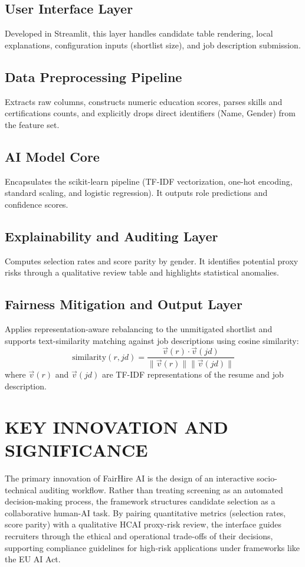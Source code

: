 \documentclass[sigconf]{acmart}
\begin{document}
\subsection{User Interface Layer}
Developed in Streamlit, this layer handles candidate table rendering, local explanations, configuration inputs (shortlist size), and job description submission.

\subsection{Data Preprocessing Pipeline}
Extracts raw columns, constructs numeric education scores, parses skills and certifications counts, and explicitly drops direct identifiers (Name, Gender) from the feature set.

\subsection{AI Model Core}
Encapsulates the scikit-learn pipeline (TF-IDF vectorization, one-hot encoding, standard scaling, and logistic regression). It outputs role predictions and confidence scores.

\subsection{Explainability and Auditing Layer}
Computes selection rates and score parity by gender. It identifies potential proxy risks through a qualitative review table and highlights statistical anomalies.

\subsection{Fairness Mitigation and Output Layer}
Applies representation-aware rebalancing to the unmitigated shortlist and supports text-similarity matching against job descriptions using cosine similarity:
\begin{equation}
\text{similarity}(r, jd) = \frac{\vec{v}(r) \cdot \vec{v}(jd)}{\|\vec{v}(r)\| \|\vec{v}(jd)\|}
\end{equation}
where $\vec{v}(r)$ and $\vec{v}(jd)$ are TF-IDF representations of the resume and job description.

\section{KEY INNOVATION AND SIGNIFICANCE}
The primary innovation of FairHire AI is the design of an interactive socio-technical auditing workflow. Rather than treating screening as an automated decision-making process, the framework structures candidate selection as a collaborative human-AI task. By pairing quantitative metrics (selection rates, score parity) with a qualitative HCAI proxy-risk review, the interface guides recruiters through the ethical and operational trade-offs of their decisions, supporting compliance guidelines for high-risk applications under frameworks like the EU AI Act.
\end{document}
